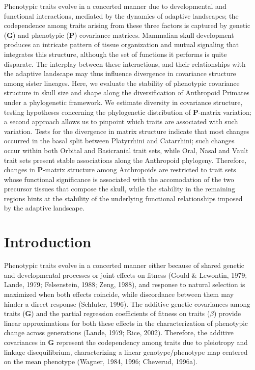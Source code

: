 \documentclass[12pt,twoside]{report}
\begin{document}
Phenotypic traits evolve in a concerted manner due to developmental and
functional interactions, mediated by the dynamics of adaptive
landscapes; the codependence among traits arising from these three
factors is captured by genetic ($\mathbf{G}$) and phenotypic
($\mathbf{P}$) covariance matrices. Mammalian skull development produces
an intricate pattern of tissue organization and mutual signaling that
integrates this structure, although the set of functions it performs is
quite disparate. The interplay between these interactions, and their
relationships with the adaptive landscape may thus influence divergence
in covariance structure among sister lineages. Here, we evaluate the
stability of phenotypic covariance structure in skull size and shape
along the diversification of Anthropoid Primates under a phylogenetic
framework. We estimate diversity in covariance structure, testing
hypotheses concerning the phylogenetic distribution of
$\mathbf{P}$-matrix variation; a second approach allows us to pinpoint
which traits are associated with such variation. Tests for the
divergence in matrix structure indicate that most changes occurred in
the basal split between Platyrrhini and Catarrhini; such changes occur
within both Orbital and Basicranial trait sets, while Oral, Nasal and
Vault trait sets present stable associations along the Anthropoid
phylogeny. Therefore, changes in $\mathbf{P}$-matrix structure among
Anthropoids are restricted to trait sets whose functional significance
is associated with the accomodation of the two precursor tissues that
compose the skull, while the stability in the remaining regions hints at
the stability of the underlying functional relationships imposed by the
adaptive landscape.

\newpage

\section{Introduction}\label{introduction-2}

Phenotypic traits evolve in a concerted manner either because of shared
genetic and developmental processes or joint effects on fitness (Gould
\& Lewontin, 1979; Lande, 1979; Felsenstein, 1988; Zeng, 1988), and
response to natural selection is maximized when both effects coincide,
while discordance between them may hinder a direct response (Schluter,
1996). The additive genetic covariances among traits ($\mathbf{G}$) and
the partial regression coefficients of fitness on traits ($\beta$)
provide linear approximations for both these effects in the
characterization of phenotypic change across generations (Lande, 1979;
Rice, 2002). Therefore, the additive covariances in $\mathbf{G}$
represent the codependency among traits due to pleiotropy and linkage
disequilibrium, characterizing a linear genotype/phenotype map centered
on the mean phenotype (Wagner, 1984, 1996; Cheverud, 1996a).
\end{document}
